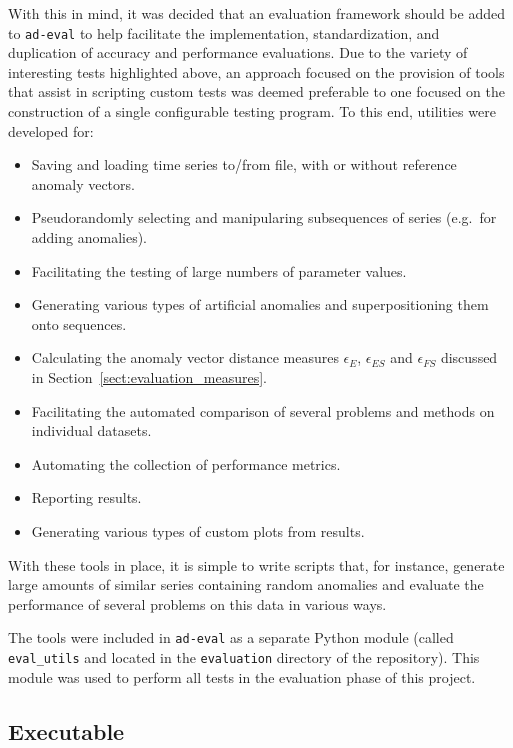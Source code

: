 With this in mind, it was decided that an evaluation framework should be added to \texttt{ad-eval} to help facilitate the implementation, standardization, and duplication of accuracy and performance evaluations. Due to the variety of interesting tests highlighted above, an approach focused on the provision of tools that assist in scripting custom tests was deemed preferable to one focused on the construction of a single configurable testing program. To this end, utilities were developed for:

\begin{itemize}
    \item Saving and loading time series to/from file, with or without reference anomaly vectors.
    \item Pseudorandomly selecting and manipularing subsequences of series (e.g.\ for adding anomalies).
    \item Facilitating the testing of large numbers of parameter values.
    \item Generating various types of artificial anomalies and superpositioning them onto sequences.
    \item Calculating the anomaly vector distance measures $\epsilon_E$, $\epsilon_{ES}$ and $\epsilon_{FS}$ discussed in Section~\ref{sect:evaluation_measures}.
    \item Facilitating the automated comparison of several problems and methods on individual datasets.
    \item Automating the collection of performance metrics.
    \item Reporting results.
    \item Generating various types of custom plots from results.
\end{itemize}

With these tools in place, it is simple to write scripts that, for instance, generate large amounts of similar series containing random anomalies and evaluate the performance of several problems on this data in various ways. 

The tools were included in \texttt{ad-eval} as a separate Python module (called \texttt{eval\_utils} and located in the \texttt{evaluation} directory of the repository). This module was used to perform all tests in the evaluation phase of this project.

\subsection{Executable}
\label{sect:executable}

